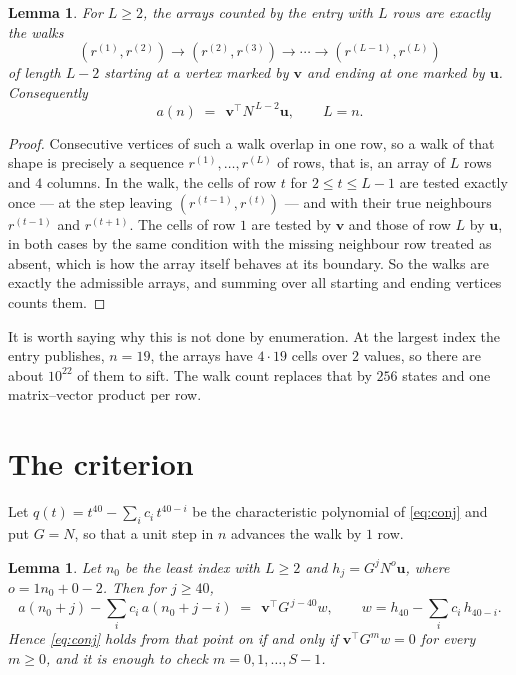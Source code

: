 \documentclass[11pt,a4paper]{article}
\theoremstyle{plain}
\newtheorem{lemma}[theorem]{Lemma}
\theoremstyle{definition}
\begin{document}
\begin{lemma}\label{lem:walk}
For $L\ge2$, the arrays counted by the entry with $L$ rows are exactly the walks
\[
(r^{(1)},r^{(2)})\to(r^{(2)},r^{(3)})\to\cdots\to(r^{(L-1)},r^{(L)})
\]
of length $L-2$ starting at a vertex marked by $\mathbf{v}$ and ending at one marked by
$\mathbf{u}$. Consequently
\[
a(n)\;=\;\,\mathbf{v}^{\!\top}N^{\,L-2}\mathbf{u},\qquad L=n .
\]
\end{lemma}

\begin{proof}
Consecutive vertices of such a walk overlap in one row, so a walk of that shape is
precisely a sequence $r^{(1)},\dots,r^{(L)}$ of rows, that is, an array of $L$ rows
and $4$ columns. In the walk, the cells of row $t$ for $2\le t\le L-1$ are tested
exactly once --- at the step leaving $(r^{(t-1)},r^{(t)})$ --- and with their true
neighbours $r^{(t-1)}$ and $r^{(t+1)}$. The cells of row $1$ are tested by
$\mathbf{v}$ and those of row $L$ by $\mathbf{u}$, in both cases by the same condition
with the missing neighbour row treated as absent, which is how the array itself behaves at
its boundary. So the walks are exactly the admissible arrays, and summing over all starting
and ending vertices counts them.
\end{proof}


It is worth saying why this is not done by enumeration. At the largest index the entry
publishes, $n=19$, the arrays have $4\cdot19$ cells over
$2$ values, so there are about $10^{22}$ of them to sift. The
walk count replaces that by $256$ states and one matrix--vector product per row.
\section{The criterion}

Let $q(t)=t^{40}-\sum_i c_i\,t^{40-i}$ be the characteristic polynomial of
\eqref{eq:conj} and put $G=N$, so that a unit step in $n$ advances the walk by
$1$ row.

\begin{lemma}\label{lem:crit}
Let $n_0$ be the least index with $L\ge2$ and $h_j=G^{j}N^{o}\mathbf{u}$, where
$o=1n_0+0-2$. Then for $j\ge40$,
\[
a(n_0+j)-\sum_i c_i\,a(n_0+j-i)\;=\;\,\mathbf{v}^{\!\top}G^{\,j-40}w,
\qquad w=h_{40}-\sum_i c_i\,h_{40-i} .
\]
Hence \eqref{eq:conj} holds from that point on if and only if
$\mathbf{v}^{\!\top}G^{m}w=0$ for every $m\ge0$, and it is enough to check
$m=0,1,\dots,S-1$.
\end{lemma}
\end{document}
